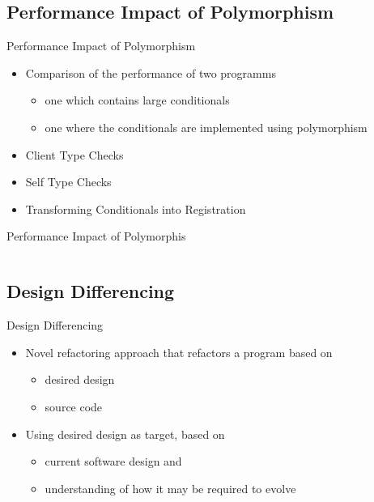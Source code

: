 \documentclass{beamer}
\begin{document}
\subsection{Performance Impact of Polymorphism}

\begin{frame}{Performance Impact of Polymorphism}
  
  \begin{itemize}
    \item Comparison of the performance of two programms
    \begin{itemize}
      \item one which contains large conditionals
      \item one where the conditionals are implemented using polymorphism
    \end{itemize}
  \end{itemize}
\pause
  \begin{itemize}
  	\item Client Type Checks
  	\item Self Type Checks
  	\item Transforming Conditionals into Registration
  \end{itemize}
\end{frame}

\begin{frame}[fragile]{Performance Impact of Polymorphis}
  \begin{columns}[T]
    \begin{column}{.49\textwidth}
      
    \end{column}
    \begin{column}{.5\textwidth}
      
    \end{column}
  \end{columns}
\end{frame}

\subsection{Design Differencing}

\begin{frame}{Design Differencing}
  
  \begin{itemize}
    \item Novel refactoring approach that refactors a program based on 
    \begin{itemize}
      \item desired design
      \item source code
    \end{itemize}
    \pause
    \item Using desired design as target, based on
    \begin{itemize}
      \item current software design and
      \item understanding of how it may be required to evolve
    \end{itemize}
  \end{itemize}
\end{frame}
\end{document}
